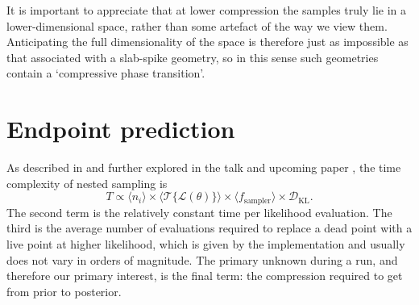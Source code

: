 \documentclass[usenatbib]{mnras}
\newcommand{\nlive}{n_i}
\newcommand{\Like}{\mathcal{L}}
\newcommand{\DKL}{\mathcal{D}_\mathrm{KL}}
\begin{document}
\par
It is important to appreciate that at lower compression the samples truly lie in a lower-dimensional space, rather than some artefact of the way we view them. Anticipating the full dimensionality of the space is therefore just as impossible as that associated with a slab-spike geometry, so in this sense such geometries contain a `compressive phase transition'. 

\section{Endpoint prediction}\label{sec:endpoint}
As described in \citet{supernest} and further explored in the talk and upcoming paper \citet{kcl_talk, scaling_frontier}, the time complexity of nested sampling is
\begin{equation}
    T \propto \langle \nlive \rangle \times \langle \mathcal{T}\{ \Like(\theta) \} \rangle \times \langle f_\mathrm{sampler} \rangle \times \DKL.
\end{equation}
The second term is the relatively constant time per likelihood evaluation. The third is the average number of evaluations required to replace a dead point with a live point at higher likelihood, which is given by the implementation and usually does not vary in orders of magnitude. The primary unknown during a run, and therefore our primary interest, is the final term: the compression required to get from prior to posterior. 
\end{document}
